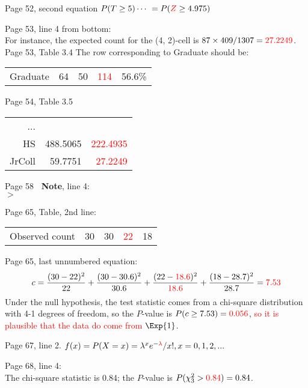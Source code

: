 \documentclass[11pt]{article}
\begin{document}
\bigskip
Page 52, second equation $P(T \ge 5) \cdots \ = P(\textcolor{red}{Z} \ge 4.975)$

\bigskip
Page 53, line 4 from bottom: \\
For instance, the expected count for the (4, 2)-cell is
$87\times 409/1307= \textcolor{red}{27.2249}$.\\

Page 53, Table 3.4 The row corresponding to Graduate should be:\\
\begin{tabular}{rrrrr}
Graduate & 64 & 50 & \textcolor{red}{114} & 56.6\%
\end{tabular}

\bigskip
Page 54, Table 3.5

\begin{tabular}{rrr}
...&&\\
HS & 488.5065 & \textcolor{red}{222.4935}\\
JrColl& 59.7751 & \textcolor{red}{27.2249}
\end{tabular}

\bigskip
Page 58 {\bf\R~Note}, line 4: \\
$>$ 

\bigskip %
Page 65, Table, 2nd line:

\begin{tabular}{rrrrr}
Observed count & 30 & 30 &  \textcolor{red}{22}& 18\\
\end{tabular}




\bigskip
Page 65, last unnumbered equation:
\[
c = \frac{(30-22)^2}{22}+\frac{(30-30.6)^2}{30.6} +
\frac{(22-\textcolor{red}{18.6})^2}{\textcolor{red}{18.6}}+\frac{(18-28.7)^2}{28.7}
=\textcolor{red}{7.53}
\]
Under the null hypothesis, the test statistic comes from a chi-square
distribution with
4-1 degrees of freedom, so the $P$-value is $P(c\ge 7.53)= \textcolor{red}{0.056}$,
\textcolor{red}{so it is plausible that
the data do come from $\Exp{1}$}.

\bigskip %
Page 67, line 2. $f(x) = P(X = x)=\lambda^x e^{-\textcolor{red}{\lambda}}/x!, x =0, 1, 2,...$


\bigskip %
Page 68, line 4: \\
The chi-square statistic is 0.84; the $P$-value is $P(\chi_3^2 > \textcolor{red}{0.84}) = 0.84$.
\end{document}
